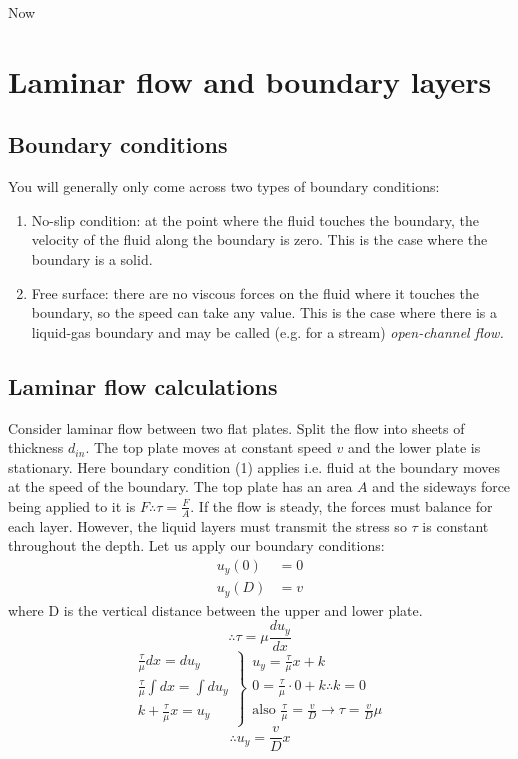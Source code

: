 \documentclass[class=report, crop=false, 12pt,a4paper]{standalone}
\begin{document}
Now 
\section{Laminar flow and boundary layers}
\subsection{Boundary conditions}
You will generally only come across two types of boundary conditions:
\begin{enumerate}[noitemsep]
  \item No-slip condition: at the point where the fluid touches the boundary, the velocity of the fluid along the boundary is zero. This is the case where the boundary is a solid.
  \item Free surface: there are no viscous forces on the fluid where it touches the boundary, so the speed can take any value. This is the case where there is a liquid-gas boundary and may be called (e.g. for a stream) \emph{open-channel flow.}
\end{enumerate}
\subsection{Laminar flow calculations}
Consider laminar flow between two flat plates. Split the flow into sheets of thickness \(d_{in}\). The top plate moves at constant speed \(v\) and the lower plate is stationary. Here boundary condition (1) applies i.e. fluid at the boundary moves at the speed of the boundary. The top plate has an area \(A\) and the sideways force being applied to it is \(F \therefore \tau = \frac{F}{A} \). If the flow is steady, the forces must balance for each layer. However, the liquid layers must transmit the stress so \(\tau\) is constant throughout the depth. Let us apply our boundary conditions:
\begin{align*}
  u_y(0) &= 0 \\ 
  u_y(D) &= v
\end{align*}
where D is the vertical distance between the upper and lower plate.
\[ \therefore \tau = \mu \frac{du_y}{dx} \]
\[
  \left.
    \begin{array}{r}
      \frac{\tau}{\mu} dx = du_y \\
      \frac{\tau}{\mu}\int dx = \int du_y \\
      k + \frac{\tau}{\mu}x = u_y
    \end{array}
  \right\}
  \begin{array}{l}
    u_y = \frac{\tau}{\mu}x + k \\
    0 = \frac{\tau}{\mu}\cdot 0 +k \therefore k = 0 \\
    \textrm{also } \frac{\tau}{\mu} = \frac{v}{D} \rightarrow \tau = \frac{v}{D}\mu
  \end{array}
\]
\[ \therefore u_y = \frac{v}{D}x \]
\end{document}
